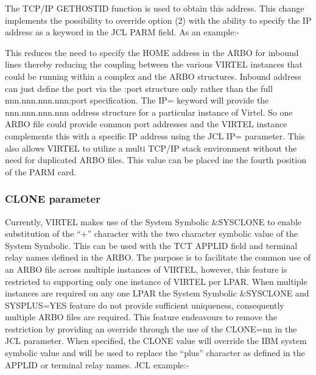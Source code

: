 \documentclass[letterpaper,10pt,english]{sphinxmanual}
\begin{document}
The TCP/IP GETHOSTID function is used to obtain this address. This change implements the possibility to override
option (2) with the ability to specify the IP address as a keyword in the JCL PARM field. As an example:-

\begin{sphinxVerbatim}[commandchars=\\\{\}]
  
\end{sphinxVerbatim}

This reduces the need to specify the HOME address in the ARBO for inbound lines thereby reducing the coupling between the various VIRTEL instances that could be running within a complex and the ARBO structures. Inbound address can just define the port via the :port structure only rather than the full nnn.nnn.nnn.nnn:port specification. The IP= keyword will provide the nnn.nnn.nnn.nnn address structure for a particular instance of Virtel. So one ARBO file could provide common port addresses and the VIRTEL instance complements this with a specific IP address using the JCL IP= parameter. This also allows VIRTEL to utilize a multi TCP/IP stack environment without the need for duplicated ARBO files. This value can be placed ine the fourth position of the PARM card.


\subsubsection{CLONE parameter}
\label{\detokenize{Installation_Guide:clone-parameter}}\label{\detokenize{Installation_Guide:index-15}}
Currently, VIRTEL makes use of the System Symbolic \&SYSCLONE to enable substitution of the “+” character with the two character symbolic value of the System Symbolic. This can be used with the TCT APPLID field and terminal relay names defined in the ARBO. The purpose is to facilitate the common use of an ARBO file across multiple instances of VIRTEL, however, this feature is restricted to supporting only one instance of VIRTEL per LPAR. When multiple instances are required on any one LPAR the System Symbolic \&SYSCLONE and SYSPLUS=YES feature do not provide sufficient uniqueness, consequently multiple ARBO files are required. This feature endeavours to remove the restriction by providing an override through the use of the CLONE=nn in the JCL parameter. When specified, the CLONE value will override the IBM system symbolic value and will be used to replace the “plus” character as defined in the APPLID or terminal relay names. JCL example:-
\end{document}
